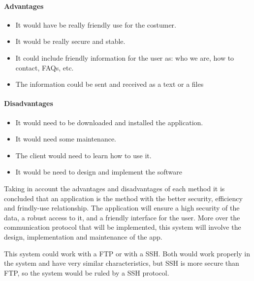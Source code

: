\paragraph{Advantages}
\begin{itemize}
\item It would have be really friendly use for the costumer.
\item It would be really secure and stable.
\item It could include friendly information for the user as: who we are, how to contact, FAQs, etc.
\item The information could be sent and received as a text or a files

\end{itemize}
\paragraph{Disadvantages}
\begin{itemize}
\item It would need to be downloaded and installed the application.
\item It would need some maintenance.
\item The client would need to learn how to use it.
\item It would be need to design and implement the software
\end{itemize}

Taking in account the advantages and disadvantages of each method it is concluded that an application is the method with the better security, efficiency and frindly-use relationship. The application will ensure a high security of the data, a robust access to it, and a friendly interface for the user. More over the communication protocol that will be implemented, this system will involve the design, implementation and maintenance of the app. 

This system could work with a FTP or with a SSH. Both would work properly in the system and have very similar characteristics, but SSH is more secure than FTP, so the system would be ruled by a SSH protocol.